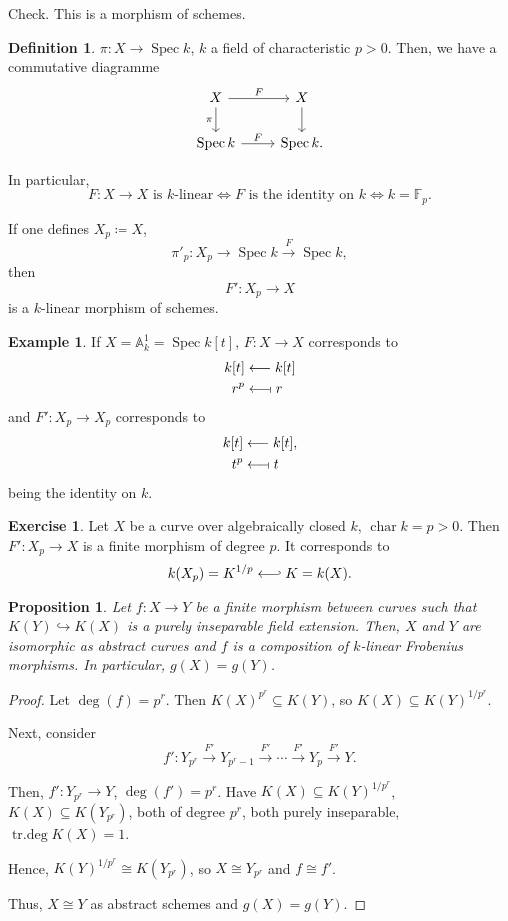 \documentclass[12pt]{article}
\DeclareMathOperator{\Spec}{Spec}
\DeclareMathOperator{\chara}{char}
\DeclareMathOperator{\trdeg}{tr.deg}
\newtheorem*{proposition}{Proposition}
\theoremstyle{definition}
\newtheorem*{definition}{Definition}
\newtheorem*{exercise}{Exercise}
\newtheorem*{example}{Example}
\theoremstyle{remark}
\begin{document}
Check. This is a morphism of schemes.

\begin{definition}
$\pi:X\rightarrow\Spec k$, $k$ a field of characteristic $p>0$. Then, we have a commutative diagramme
\[
\begin{tikzcd}
X\arrow[r,"F"]\arrow[d,swap,"\pi"]&X\arrow[d]\\
\Spec k\arrow[r,"F"]&\Spec k.
\end{tikzcd}
\]

In particular,
\[F:X\rightarrow X\text{ is }k\text{-linear}\Longleftrightarrow F\text{ is the identity on }k\Longleftrightarrow k=\mathbb{F}_p.\]

If one defines $X_p\coloneqq X$,
\[\pi'_p:X_p\longrightarrow\Spec k\overset{F}{\longrightarrow}\Spec k,\]
then
\[F':X_p\longrightarrow X\]
is a $k$-linear morphism of schemes.
\end{definition}

\begin{example}
If $X=\mathbb{A}_k^1=\Spec k[t]$, $F:X\rightarrow X$ corresponds to
\begin{align*}
k[t]&\longleftarrow k[t]\\
r^p&\longleftarrow\!\shortmid r
\end{align*}
and $F':X_p\rightarrow X_p$ corresponds to
\begin{align*}
k[t]&\longleftarrow k[t],\\
t^p&\longleftarrow\!\shortmid t
\end{align*}
being the identity on $k$.
\end{example}

\begin{exercise}
Let $X$ be a curve over algebraically closed $k$, $\chara k=p>0$. Then $F':X_p\rightarrow X$ is a finite morphism of degree $p$. It corresponds to
\[k(X_p)=K^{1/p}\longleftarrow\joinrel\rhook K=k(X).\]
\end{exercise}

\begin{proposition}
Let $f:X\rightarrow Y$ be a finite morphism between curves such that $K(Y)\hookrightarrow K(X)$ is a purely inseparable field extension. Then, $X$ and $Y$ are isomorphic as abstract curves and $f$ is a composition of $k$-linear Frobenius morphisms. In particular, $g(X)=g(Y)$.
\end{proposition}

\begin{proof}
Let $\deg(f)=p^r$. Then $K(X)^{p^r}\subseteq K(Y)$, so $K(X)\subseteq K(Y)^{1/p^r}$.

Next, consider
\[f':Y_{p^r}\overset{F'}{\longrightarrow}Y_{p^r-1}\overset{F'}{\longrightarrow}\cdots\overset{F'}{\longrightarrow}Y_p\overset{F'}{\longrightarrow}Y.\]

Then, $f':Y_{p^r}\rightarrow Y$, $\deg(f')=p^r$. Have $K(X)\subseteq K(Y)^{1/p^r}$, $K(X)\subseteq K(Y_{p^r})$, both of degree $p^r$, both purely inseparable, $\trdeg K(X)=1$.

Hence, $K(Y)^{1/p^r}\cong K(Y_{p^r})$, so $X\cong Y_{p^r}$ and $f\cong f'$.

Thus, $X\cong Y$ as abstract schemes and $g(X)=g(Y)$.
\end{proof}
\end{document}
